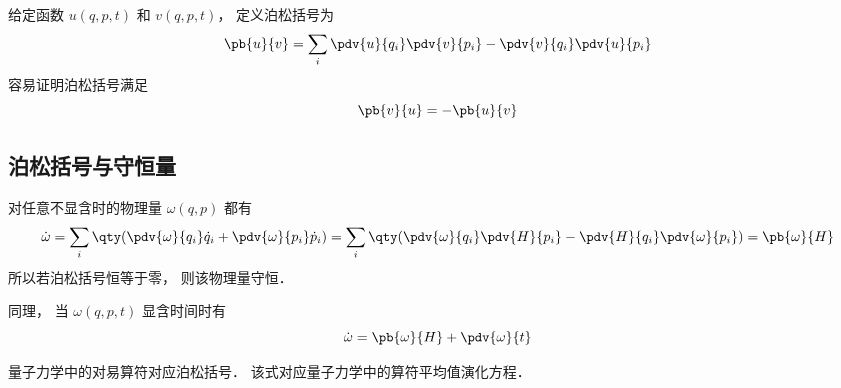 
\begin{issues}
\issueDraft
\end{issues}


给定函数 $u(q, p, t)$ 和 $v(q, p, t)$， 定义泊松括号为
\begin{equation}
\pb{u}{v} = \sum_i \pdv{u}{q_i}\pdv{v}{p_i} - \pdv{v}{q_i}\pdv{u}{p_i}
\end{equation}
容易证明泊松括号满足
\begin{equation}
\pb{v}{u} = -\pb{u}{v}
\end{equation}

\subsection{泊松括号与守恒量}
对任意不显含时的物理量 $\omega (q,p)$ 都有
\begin{equation}\label{poison_eq1}
\dot \omega  = \sum_i \qty(\pdv{\omega}{q_i} \dot q_i + \pdv{\omega}{p_i} \dot p_i)
= \sum_i \qty(\pdv{\omega}{q_i} \pdv{H}{p_i} - \pdv{H}{q_i} \pdv{\omega}{p_i})
= \pb{\omega}{H} 
\end{equation}
所以若泊松括号恒等于零， 则该物理量守恒．

同理， 当 $\omega (q,p,t)$ 显含时间时有
\begin{equation}
\dot \omega  =  \pb{\omega}{H}  + \pdv{\omega}{t}
\end{equation}

量子力学中的对易算符对应泊松括号． 该式对应量子力学中的算符平均值演化方程． %
